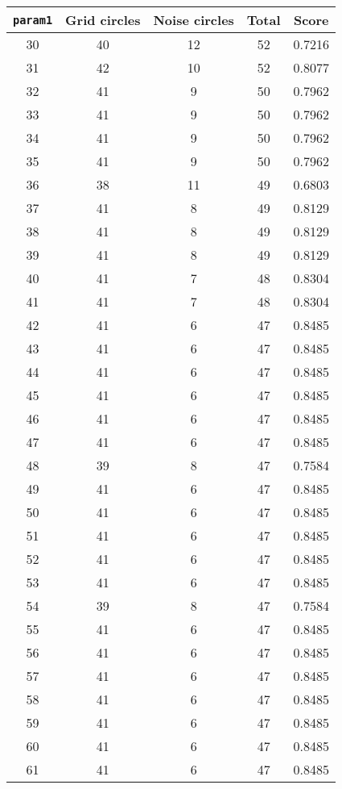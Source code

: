 \documentclass[letterpaper, 12pt]{article}
\begin{document}
\begin{longtable}{|c|c|c|c|c|}
\hline
\textbf{\texttt{param1}} & \textbf{Grid circles} & \textbf{Noise circles} & \textbf{Total} & \textbf{Score} \\
\hline
30 & 40 & 12 & 52 & 0.7216 \\
\hline
31 & 42 & 10 & 52 & 0.8077 \\
\hline
32 & 41 & 9 & 50 & 0.7962 \\
\hline
33 & 41 & 9 & 50 & 0.7962 \\
\hline
34 & 41 & 9 & 50 & 0.7962 \\
\hline
35 & 41 & 9 & 50 & 0.7962 \\
\hline
36 & 38 & 11 & 49 & 0.6803 \\
\hline
37 & 41 & 8 & 49 & 0.8129 \\
\hline
38 & 41 & 8 & 49 & 0.8129 \\
\hline
39 & 41 & 8 & 49 & 0.8129 \\
\hline
40 & 41 & 7 & 48 & 0.8304 \\
\hline
41 & 41 & 7 & 48 & 0.8304 \\
\hline
42 & 41 & 6 & 47 & 0.8485 \\
\hline
43 & 41 & 6 & 47 & 0.8485 \\
\hline
44 & 41 & 6 & 47 & 0.8485 \\
\hline
45 & 41 & 6 & 47 & 0.8485 \\
\hline
46 & 41 & 6 & 47 & 0.8485 \\
\hline
47 & 41 & 6 & 47 & 0.8485 \\
\hline
48 & 39 & 8 & 47 & 0.7584 \\
\hline
49 & 41 & 6 & 47 & 0.8485 \\
\hline
50 & 41 & 6 & 47 & 0.8485 \\
\hline
51 & 41 & 6 & 47 & 0.8485 \\
\hline
52 & 41 & 6 & 47 & 0.8485 \\
\hline
53 & 41 & 6 & 47 & 0.8485 \\
\hline
54 & 39 & 8 & 47 & 0.7584 \\
\hline
55 & 41 & 6 & 47 & 0.8485 \\
\hline
56 & 41 & 6 & 47 & 0.8485 \\
\hline
57 & 41 & 6 & 47 & 0.8485 \\
\hline
58 & 41 & 6 & 47 & 0.8485 \\
\hline
59 & 41 & 6 & 47 & 0.8485 \\
\hline
60 & 41 & 6 & 47 & 0.8485 \\
\hline
61 & 41 & 6 & 47 & 0.8485 \\

\end{longtable}
\end{document}
